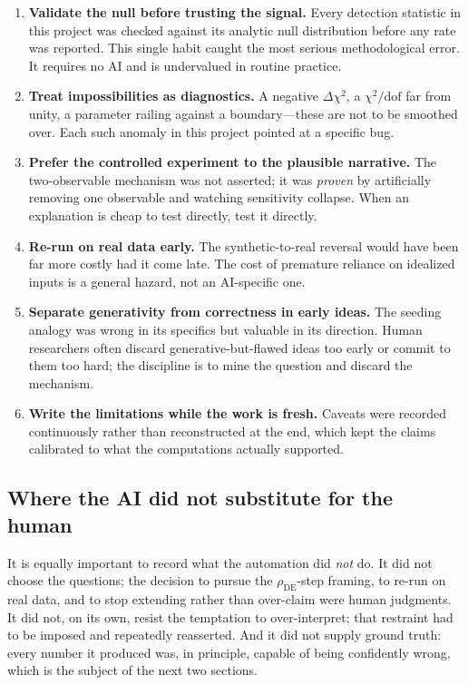 \documentclass[11pt]{article}
\newcommand{\rhoDE}{\rho_{\mathrm{DE}}}
\begin{document}
\begin{enumerate}[leftmargin=1.5em]
  \item \textbf{Validate the null before trusting the signal.} Every detection
        statistic in this project was checked against its analytic null
        distribution before any rate was reported. This single habit caught the
        most serious methodological error. It requires no AI and is undervalued in
        routine practice.
  \item \textbf{Treat impossibilities as diagnostics.} A negative $\Delta\chi^2$,
        a $\chi^2/\text{dof}$ far from unity, a parameter railing against a
        boundary---these are not to be smoothed over. Each such anomaly in this
        project pointed at a specific bug.
  \item \textbf{Prefer the controlled experiment to the plausible narrative.} The
        two-observable mechanism was not asserted; it was \emph{proven} by
        artificially removing one observable and watching sensitivity collapse.
        When an explanation is cheap to test directly, test it directly.
  \item \textbf{Re-run on real data early.} The synthetic-to-real reversal would
        have been far more costly had it come late. The cost of premature reliance
        on idealized inputs is a general hazard, not an AI-specific one.
  \item \textbf{Separate generativity from correctness in early ideas.} The seeding
        analogy was wrong in its specifics but valuable in its direction. Human
        researchers often discard generative-but-flawed ideas too early or commit
        to them too hard; the discipline is to mine the question and discard the
        mechanism.
  \item \textbf{Write the limitations while the work is fresh.} Caveats were
        recorded continuously rather than reconstructed at the end, which kept the
        claims calibrated to what the computations actually supported.
\end{enumerate}

\subsection{Where the AI did not substitute for the human}

It is equally important to record what the automation did \emph{not} do. It did not
choose the questions; the decision to pursue the $\rhoDE$-step framing, to re-run on
real data, and to stop extending rather than over-claim were human judgments. It did
not, on its own, resist the temptation to over-interpret; that restraint had to be
imposed and repeatedly reasserted. And it did not supply ground truth: every number
it produced was, in principle, capable of being confidently wrong, which is the
subject of the next two sections.
\end{document}
